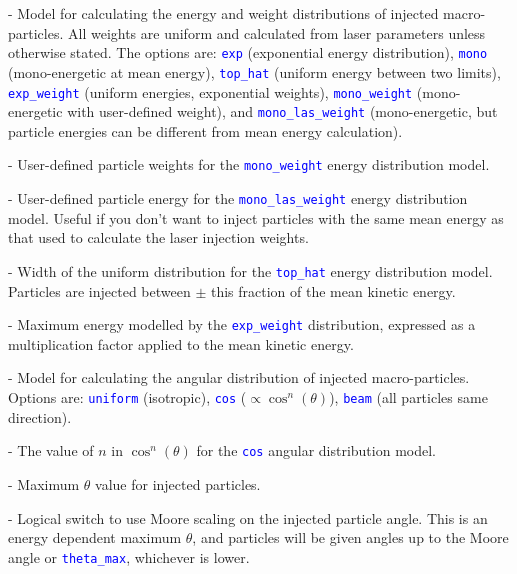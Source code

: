 \documentclass[12pt]{article}
\numberwithin{equation}{section}
\begin{document}
\bigskip {\large\textcolor{blue}{energy\_dist}} - Model for calculating the energy and weight distributions of injected macro-particles. All weights are uniform and calculated from laser parameters unless otherwise stated. The options are: \textcolor{blue}{\texttt{exp}} (exponential energy distribution), \textcolor{blue}{\texttt{mono}} (mono-energetic at mean energy), \textcolor{blue}{\texttt{top\_hat}} (uniform energy between two limits), \textcolor{blue}{\texttt{exp\_weight}} (uniform energies, exponential weights), \textcolor{blue}{\texttt{mono\_weight}} (mono-energetic with user-defined weight), and \textcolor{blue}{\texttt{mono\_las\_weight}} (mono-energetic, but particle energies can be different from mean energy calculation).

\bigskip {\large\textcolor{blue}{mono\_weight}} - User-defined particle weights for the \textcolor{blue}{\texttt{mono\_weight}} energy distribution model.

\bigskip {\large\textcolor{blue}{las\_weight\_KE}} - User-defined particle energy for the \textcolor{blue}{\texttt{mono\_las\_weight}} energy distribution model. Useful if you don't want to inject particles with the same mean energy as that used to calculate the laser injection weights.

\bigskip {\large\textcolor{blue}{top\_hat\_L}} - Width of the uniform distribution for the \textcolor{blue}{\texttt{top\_hat}} energy distribution model. Particles are injected between $\pm$ this fraction of the mean kinetic energy.

\bigskip {\large\textcolor{blue}{mean\_mult}} - Maximum energy modelled by the \textcolor{blue}{\texttt{exp\_weight}} distribution, expressed as a multiplication factor applied to the mean kinetic energy.

\bigskip {\large\textcolor{blue}{angular\_dist}} - Model for calculating the angular distribution of injected macro-particles. Options are: \textcolor{blue}{\texttt{uniform}} (isotropic), \textcolor{blue}{\texttt{cos}} ($\propto \cos^n(\theta)$), \textcolor{blue}{\texttt{beam}} (all particles same direction).

\bigskip {\large\textcolor{blue}{cos\_n\_power}} - The value of $n$ in $\cos^{n}(\theta)$ for the \textcolor{blue}{\texttt{cos}} angular distribution model. 

\bigskip {\large\textcolor{blue}{theta\_max}} - Maximum $\theta$ value for injected particles.

\bigskip {\large\textcolor{blue}{use\_moore\_max}} - Logical switch to use Moore scaling on the injected particle angle. This is an energy dependent maximum $\theta$, and particles will be given angles up to the Moore angle or \textcolor{blue}{\texttt{theta\_max}}, whichever is lower.    
\end{document}
